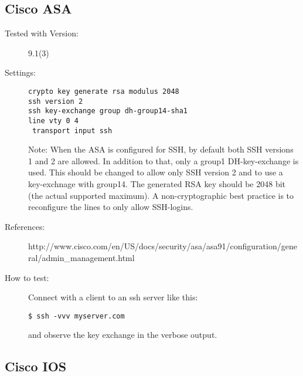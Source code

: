 \subsection{Cisco ASA}


\begin{description}
\item[Tested with Version:]9.1(3) 

\item[Settings:] \mbox{}
\begin{lstlisting}[breaklines]
crypto key generate rsa modulus 2048
ssh version 2
ssh key-exchange group dh-group14-sha1
line vty 0 4
 transport input ssh
\end{lstlisting}
Note: When the ASA is configured for SSH, by default both SSH versions 1 and 2 are allowed. In addition to that, only a group1 DH-key-exchange is used. This should be changed to allow only SSH version 2 and to use a key-exchnage with group14. The generated RSA key should be 2048 bit (the actual supported maximum). A non-cryptographic best practice is to reconfigure the lines to only allow SSH-logins.
\item[References:]
http://www.cisco.com/en/US/docs/security/asa/asa91/configuration/general/admin\_management.html 


\item[How to test:]
Connect with a client to an ssh server like this: \\
\begin{lstlisting}[breaklines]
$ ssh -vvv myserver.com
\end{lstlisting}and observe the key exchange in the verbose output.
\end{description}


\subsection{Cisco IOS}


